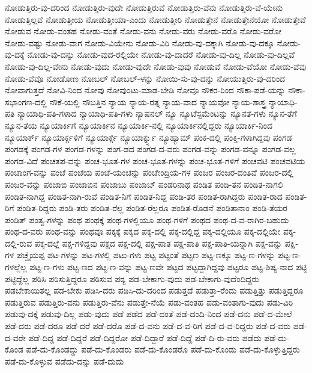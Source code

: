 {ನೋಡುತ್ತಿರು-ವು-ದರಿಂದ
ನೋಡುತ್ತಿರು-ವುದೇ
ನೋಡುತ್ತಿರುವೆ
ನೋಡುತ್ತಿರು-ವೆನು
ನೋಡುತ್ತಿರು-ವೆ-ಯೇನು
ನೋಡುತ್ತಿಲ್ಲವೆ
ನೋಡುತ್ತೀಯ
ನೋಡುತ್ತೀಯಾ-ಎಂದು
ನೋಡುತ್ತೀರಿ
ನೋಡುತ್ತೇನೆ
ನೋಡುತ್ತೇನೆಯೋ
ನೋಡುತ್ತೇವೆ
ನೋಡುವ
ನೋಡು-ವಂತಹ
ನೋಡು-ವಂತೆ
ನೋಡು-ವನು
ನೋಡು-ವರು
ನೋಡು-ವರೊ
ನೋಡು-ವರೋ
ನೋಡು-ವಷ್ಟು
ನೋಡು-ವಾಗ
ನೋಡು-ವಿಯೇನು
ನೋಡು-ವಿರಿ
ನೋಡು-ವು-ದಕ್ಕಾಗಿ
ನೋಡು-ವು-ದಕ್ಕೂ
ನೋಡು-ವು-ದಕ್ಕೆ
ನೋಡು-ವು-ದನ್ನು
ನೋಡು-ವುದ-ರಲ್ಲಿಯೇ
ನೋಡು-ವು-ದಾದರೆ
ನೋಡು-ವು-ದಿಲ್ಲ
ನೋಡು-ವು-ದಿಲ್ಲವೆ
ನೋಡು-ವು-ದಿಲ್ಲ-ವೇನು
ನೋಡು-ವುದು
ನೋಡು-ವುದೇ
ನೋಡು-ವುವು
ನೋಡುವೆ
ನೋಡು-ವೆಯೋ
ನೋಡು-ವೆವು
ನೋಡು-ವೆವೊ
ನೋಡೋಣ
ನೋಬಲ್
ನೋಬಲ್-ಳನ್ನು
ನೋಯಿ-ಸು-ವು-ದನ್ನು
ನೋಯುತ್ತಿರು-ವು-ದರಿಂದ
ನೋವಾಗುತ್ತದೆ
ನೋವಿ-ನಿಂದ
ನೋವು
ನೋವುಂಟು-ಮಾಡ-ಬೇಡಿ
ನೋವೂ
ನೌಕರ-ರಿಂದ
ನೌಕಾ-ಪಡೆ-ಯನ್ನು
ನೌಕಾ-ಸಭಾಂಗಣ-ದಲ್ಲಿ
ನೌಕೆ-ಯಲ್ಲಿ
ನೌಬತ್ತಿನ
ನ್ಯಾಯ
ನ್ಯಾಯ-ರತ್ನ
ನ್ಯಾಯ-ವಾದ
ನ್ಯಾಯವೋ
ನ್ಯಾಯ-ಶಾಸ್ತ್ರ
ನ್ಯಾಯಾಧಿ-ಪತಿ
ನ್ಯಾಯಾಧಿ-ಪತಿ-ಗಳಾದ
ನ್ಯಾಯಾಧಿ-ಪತಿ-ಗಳು
ನ್ಯಾಷನಲ್
ನ್ಯೂ
ನ್ಯೂಟೆಸ್ಟಮೆಂಟನ್ನು
ನ್ಯೂನತೆ-ಗಳು
ನ್ಯೂನ-ತೆಗೆ
ನ್ಯೂನ-ತೆಯ
ನ್ಯೂಯಾರ್ಕಿಗೆ
ನ್ಯೂಯಾರ್ಕಿನ
ನ್ಯೂಯಾರ್ಕಿ-ನಲ್ಲಿ
ನ್ಯೂಯಾರ್ಕಿನಲ್ಲಿದ್ದರು
ನ್ಯೂಯಾರ್ಕಿ-ನಿಂದ
ನ್ಯೂಯಾರ್ಕ್
ನ್ಯೂಯಾರ್ಕ್ಗಳಿಗೆ
ನ್ಯೂಯಾರ್ಕ್ಗೆ
ನ್ಯೂಯಾರ್ಕ್ನ್ನು
ನ್ಯೂಹ್ಯಾಮ್
ಪಂಕ-ದಲ್ಲಿ
ಪಂಕ್ತಿ-ಗಳಾಗಿದ್ದವು
ಪಂಗಡ
ಪಂಗಡಕ್ಕೆ
ಪಂಗಡ-ಗಳ
ಪಂಗಡ-ಗಳನ್ನು
ಪಂಗ-ಡದ
ಪಂಗಡ-ದ-ವರು
ಪಂಗಡ-ವನ್ನು
ಪಂಗಡ-ವನ್ನೂ
ಪಂಗಡ-ವಲ್ಲ
ಪಂಗಡ-ವಿದೆ
ಪಂಚತಪ-ವನ್ನು
ಪಂಚ-ಭೂತ-ಗಳ
ಪಂಚ-ಭೂತ-ಗಳನ್ನು
ಪಂಚ-ಭೂತ-ಗಳಿಗೆ
ಪಂಚವಟಿ
ಪಂಚವಟಿಯ
ಪಂಚಾಂಗ-ವನ್ನು
ಪಂಚೆ
ಪಂಚೆಯ
ಪಂಚೆ-ಯಂಚನ್ನು
ಪಂಚೇಂದ್ರಿಯ-ಗಳ
ಪಂಜರ
ಪಂಜರ-ದಂತಿವೆ
ಪಂಜರ-ದಲ್ಲಿ
ಪಂಜರ-ವನ್ನು
ಪಂಜಾಬಿ
ಪಂಜಾಬಿನ
ಪಂಜಾಬು
ಪಂಜಾಬ್
ಪಂಡರಿನಾಥ
ಪಂಡಿತ
ಪಂಡಿ-ತನ
ಪಂಡಿತ-ನಾಗಲಿ
ಪಂಡಿತ-ನಾಗಿದ್ದ
ಪಂಡಿತ-ನಾಗಿ-ರುವೆ
ಪಂಡಿತ-ನಿಗೆ
ಪಂಡಿತ-ನಿದ್ದ
ಪಂಡಿ-ತರ
ಪಂಡಿತ-ರಾಗಿದ್ದರು
ಪಂಡಿತ-ರಾದ
ಪಂಡಿತ-ರಿಗೆ
ಪಂಡಿತ-ರಿದ್ದರು
ಪಂಡಿ-ತರು
ಪಂಡಿತ-ರೆಲ್ಲ
ಪಂಡಿತ-ರೆಲ್ಲರೂ
ಪಂಡಿತ-ರೊಡನೆ
ಪಂಡಿತಾನಾಂ
ಪಂಡಿ-ತೆಯರ
ಪಂಡಿತ್
ಪಂತ್ವ-ಗಳನ್ನು
ಪಂಥ
ಪಂಥಕ್ಕೆ
ಪಂಥ-ಗಳಲ್ಲಿಯೂ
ಪಂಥ-ಗಳಿಗೆ
ಪಂಥದ
ಪಂಥ-ದ-ವ-ರಾಗಿರ-ಬಹುದು
ಪಂಥ-ದ-ವರು
ಪಂಥ-ವನ್ನು
ಪಂಥವೂ
ಪಕ್ಕಕ್ಕೆ
ಪಕ್ಕದ
ಪಕ್ಕ-ದಲ್ಲಿ
ಪಕ್ಕ-ದಲ್ಲಿದ್ದ
ಪಕ್ಕ-ದಲ್ಲಿಯೂ
ಪಕ್ಕ-ದಲ್ಲಿಯೇ
ಪಕ್ಕ-ದಲ್ಲಿ-ರುವ
ಪಕ್ಕ-ದಲ್ಲೆ
ಪಕ್ಷ-ಗಳಿದ್ದವು
ಪಕ್ಷದ
ಪಕ್ಷ-ದಲ್ಲಿ
ಪಕ್ಷ-ಪಾತ
ಪಕ್ಷ-ಪಾತಿ
ಪಕ್ಷ-ಪಾತಿ-ಯನ್ನಾಗಿ
ಪಕ್ಷ-ವನ್ನು
ಪಕ್ಷಿ-ಗಳ
ಪಚ್ಚೈಯಪ್ಪ
ಪಟ-ಗಳನ್ನು
ಪಟ-ಗಳಲ್ಲಿ
ಪಟು-ಗಳು
ಪಟ್ಟ
ಪಟ್ಟಂತೆ
ಪಟ್ಟಣ
ಪಟ್ಟ-ಣಕ್ಕೂ
ಪಟ್ಟ-ಣ-ಗಳನ್ನು
ಪಟ್ಟ-ಣ-ಗಳಲ್ಲೆಲ್ಲ
ಪಟ್ಟ-ಣ-ಗಳು
ಪಟ್ಟ-ಣದ
ಪಟ್ಟ-ಣ-ವನ್ನು
ಪಟ್ಟ-ಣವೇ
ಪಟ್ಟದ
ಪಟ್ಟದ್ದಾಗಿದ್ದವು
ಪಟ್ಟರೂ
ಪಟ್ಟ-ಶಿಷ್ಯ-ನಾದ
ಪಟ್ಟಿ
ಪಟ್ಟಿದ್ದೆಲ್ಲ
ಪಠಿಸಿ
ಪಠಿಸುತ್ತಿದ್ದರೂ
ಪಠಿಸುವ
ಪಠ್ಯ
ಪಡ-ಬೇಕಾಗು-ವುದು
ಪಡ-ಬೇಕಾಗು-ವುದೆಂದಿದ್ದರು
ಪಡಬೇಕಾಯಿತಲ್ಲ
ಪಡ-ಬೇಕು
ಪಡಿಸಿ-ದರು
ಪಡಿಸಿ-ದು-ದರಿಂದ
ಪಡುತ್ತದೆ
ಪಡುತ್ತಾ-ರೆಂದು
ಪಡುತ್ತಿತ್ತು
ಪಡುತ್ತಿದ್ದರೂ
ಪಡುತ್ತಿರುವ
ಪಡುತ್ತಿರು-ವನು
ಪಡುತ್ತಿರು-ವೆನು
ಪಡುತ್ತೇ-ನೆಯೆ
ಪಡು-ವಂತಹ
ಪಡು-ವಂತಾಗು-ವುದು
ಪಡು-ವಿರಿ
ಪಡುವು-ದಕ್ಕೆ
ಪಡುವು-ದಿಲ್ಲ
ಪಡು-ವುದು
ಪಡೆ
ಪಡೆದ
ಪಡೆ-ದಂತೆ
ಪಡೆ-ದಂದಿ-ನಿಂದ
ಪಡೆ-ದನು
ಪಡೆ-ದ-ಮೇಲೆ
ಪಡೆ-ದರು
ಪಡೆ-ದರೂ
ಪಡೆ-ದರೆ
ಪಡೆ-ದರೊ
ಪಡೆ-ದ-ವನು
ಪಡೆ-ದ-ವ-ರಿಗೆ
ಪಡೆ-ದ-ವ-ರಿದ್ದರು
ಪಡೆ-ದ-ವರು
ಪಡೆ-ದ-ವರೇ
ಪಡೆ-ದಿದ್ದ
ಪಡೆ-ದಿದ್ದರೆ
ಪಡೆ-ದಿದ್ದರೋ
ಪಡೆ-ದಿದ್ದಾರೆ
ಪಡೆ-ದಿದ್ದೆ
ಪಡೆ-ದಿ-ರು-ವರು
ಪಡೆದು
ಪಡೆ-ದು-ಕೊಂಡ
ಪಡೆ-ದು-ಕೊಂಡದ್ದು
ಪಡೆ-ದು-ಕೊಂಡರು
ಪಡೆ-ದು-ಕೊಂಡರೊ
ಪಡೆ-ದು-ಕೊಂಡು
ಪಡೆ-ದು-ಕೊಳ್ಳುತ್ತಿದ್ದರು
ಪಡೆ-ದು-ಕೊಳ್ಳುವ
ಪಡೆದು-ದನ್ನು
ಪಡೆ-ದುದು
}
